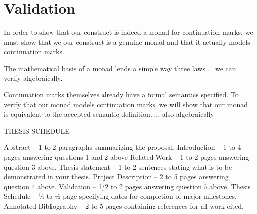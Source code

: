 \documentclass[ms]{byuprop}
\begin{document}
\section{Validation}


In order to show that our construct is indeed a monad for continuation marks, we must show that we our construct is a genuine monad and that it actually models continuation marks.

The mathematical basis of a monad lends a simple way three laws ... we can verify algebraically.

Continuation marks themselves already have a formal semantics specified. To verify that our monad models continuation marks, we will show that our monad is equivalent to the accepted semantic definition. ... also algebraically











    
    
THESIS SCHEDULE

Abstract – 1 to 2 paragraphs summarizing the proposal.
Introduction – 1 to 4 pages answering questions 1 and 2 above
Related Work – 1 to 2 pages answering question 3 above.
Thesis statement – 1 to 2 sentences stating what is to be demonstrated in your thesis.
Project Description – 2 to 5 pages answering question 4 above.
Validation – 1/2 to 2 pages answering question 5 above.
Thesis Schedule – ¼ to ½ page specifying dates for completion of major milestones.
Annotated Bibliography – 2 to 5 pages containing references for all work cited.




\end{document}
